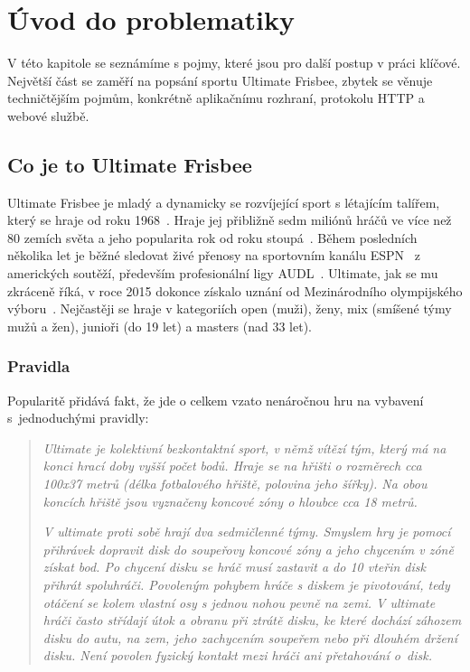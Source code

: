 \chapter{Úvod do problematiky}

V této kapitole se seznámíme s pojmy, které jsou pro další postup v práci klíčové. 
Největší část se zaměří na popsání sportu Ultimate Frisbee, zbytek se věnuje techničtějším pojmům,
konkrétně aplikačnímu rozhraní, protokolu HTTP a webové službě.

\section{Co je to Ultimate Frisbee}

Ultimate Frisbee je mladý a dynamicky se rozvíjející sport s létajícím talířem,
který se hraje od roku 1968~\cite{cald_ultimate}. Hraje jej přibližně sedm miliónů
hráčů ve více než 80 zemích světa a jeho popularita rok od roku stoupá~\cite{usa_ultimate}.
Během posledních několika let je běžné sledovat živé přenosy na sportovním kanálu ESPN~\cite{espn}
z amerických soutěží, především profesionální ligy AUDL~\cite{audl}. Ultimate, jak se mu zkráceně říká, v roce 2015 dokonce získalo
uznání od Mezinárodního olympijského výboru~\cite{cald_uznani}. Nejčastěji se hraje v kategoriích
open (muži), ženy, mix (smíšené týmy mužů a žen), junioři (do 19 let) a masters (nad 33 let).

\subsection{Pravidla}

Popularitě přidává fakt, že jde o celkem vzato nenáročnou hru na vybavení s~jednoduchými pravidly:

\begin{quote}
  \textit{
    Ultimate je kolektivní bezkontaktní sport, v němž vítězí tým, který má na konci hrací doby
    vyšší počet bodů. Hraje se na hřišti o rozměrech cca 100x37 metrů (délka fotbalového hřiště,
    polovina jeho šířky). Na obou koncích hřiště jsou vyznačeny koncové zóny o hloubce cca 18 metrů.
  }
  
  \textit{
    V ultimate proti sobě hrají dva sedmičlenné týmy. Smyslem hry je pomocí přihrávek dopravit disk
    do soupeřovy koncové zóny a jeho chycením v zóně získat bod. Po chycení disku se hráč musí
    zastavit a do 10 vteřin disk přihrát spoluhráči. Povoleným pohybem hráče s diskem je pivotování,
    tedy otáčení se kolem vlastní osy s jednou nohou pevně na zemi. V ultimate hráči často střídají
    útok a obranu při ztrátě disku, ke které dochází záhozem disku do autu, na zem, jeho zachycením
    soupeřem nebo při dlouhém držení disku. Není povolen fyzický kontakt mezi hráči ani přetahování
    o~disk.~\cite{cald_ultimate}
  }
\end{quote}

